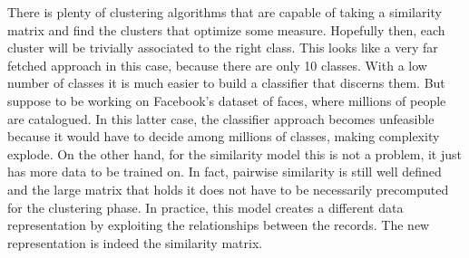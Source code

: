 \bigbreak
\noindent There is plenty of clustering algorithms that are capable of taking a similarity matrix and find the clusters that optimize some measure. Hopefully then, each cluster will be trivially associated to the right class. This looks like a very far fetched approach in this case, because there are only 10 classes. With a low number of classes it is much easier to build a classifier that discerns them. But suppose to be working on Facebook's dataset of faces, where millions of people are catalogued. In this latter case, the classifier approach becomes unfeasible because it would have to decide among millions of classes, making complexity explode. On the other hand, for the similarity model this is not a problem, it just has more data to be trained on. In fact, pairwise similarity is still well defined and the large matrix that holds it does not have to be necessarily precomputed for the clustering phase. In practice, this model creates a different data representation by exploiting the relationships between the records. The new representation is indeed the similarity matrix.
\bigbreak

